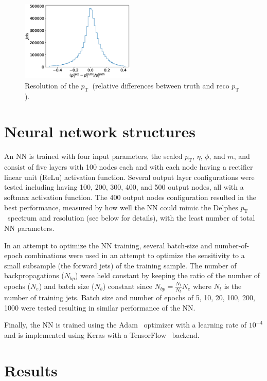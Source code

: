 \documentclass[showpacs,showkeys,preprint,prd,nofootinbib,linenumbers,12pt,superscriptaddress]{revtex4-1}
\def\pt{\ensuremath{p_{\mathrm{T}}}}
\begin{document}
\begin{figure}[h]
  \includegraphics[width=0.48\textwidth]{figures/nn/pTRes_nobounds_prescaling.eps}
  \caption{Resolution of the \pt\ (relative differences between truth and reco \pt).}
  \label{fig:deltaTarget}
\end{figure}


\section{Neural network structures}

An NN is trained with four input parameters, the scaled \pt, $\eta$, $\phi$, and $m$, and consist of five layers with 100 nodes each and with each node having a rectifier linear unit (ReLu) activation function. Several output layer configurations were tested including having 100, 200, 300, 400, and 500 output nodes, all with a softmax activation function. The 400 output nodes configuration resulted in the best performance, measured by how well the NN could mimic the Delphes \pt\ spectrum and resolution (see below for details), with the least number of total NN parameters. 

In an attempt to optimize the NN training, several batch-size and number-of-epoch combinations were used in an attempt to optimize the sensitivity to a small subsample (the forward jets) of the training sample. The number of backpropagations ($N_{bp}$) were held constant by keeping the ratio of the number of epochs ($N_e$) and batch size ($N_b$) constant since $N_{bp}=\frac{N_t}{N_b}N_e$ where $N_t$ is the number of training jets. Batch size and number of epochs of 5, 10, 20, 100, 200, 1000 were tested resulting in similar performance of the NN.

Finally, the NN is trained using the Adam~\cite{adam} optimizer with a learning rate of $10^{-4}$ and is implemented using Keras with a TensorFlow~\cite{tensorflow2015-whitepaper} backend.

\section{Results}
\FloatBarrier
\end{document}
